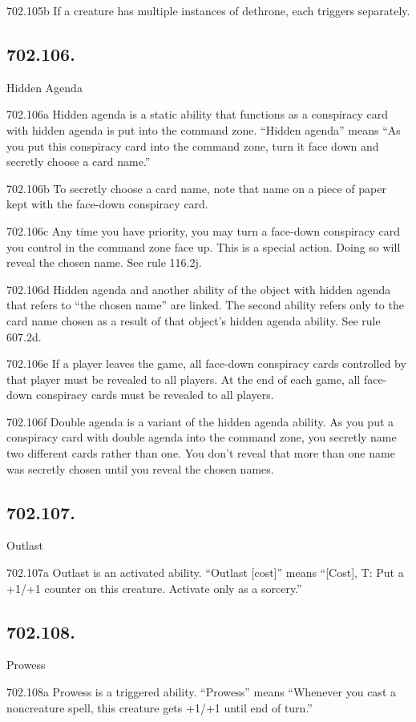 702.105b If a creature has multiple instances of dethrone, each triggers separately.

\subsection*{702.106.}
Hidden Agenda

702.106a Hidden agenda is a static ability that functions as a conspiracy card with hidden agenda is put into the command zone. “Hidden agenda” means “As you put this conspiracy card into the command zone, turn it face down and secretly choose a card name.”

702.106b To secretly choose a card name, note that name on a piece of paper kept with the face-down conspiracy card.

702.106c Any time you have priority, you may turn a face-down conspiracy card you control in the command zone face up. This is a special action. Doing so will reveal the chosen name. See rule 116.2j.

702.106d Hidden agenda and another ability of the object with hidden agenda that refers to “the chosen name” are linked. The second ability refers only to the card name chosen as a result of that object’s hidden agenda ability. See rule 607.2d.

702.106e If a player leaves the game, all face-down conspiracy cards controlled by that player must be revealed to all players. At the end of each game, all face-down conspiracy cards must be revealed to all players.

702.106f Double agenda is a variant of the hidden agenda ability. As you put a conspiracy card with double agenda into the command zone, you secretly name two different cards rather than one. You don’t reveal that more than one name was secretly chosen until you reveal the chosen names.

\subsection*{702.107.}
Outlast

702.107a Outlast is an activated ability. “Outlast [cost]” means “[Cost], {T}: Put a +1/+1 counter on this creature. Activate only as a sorcery.”

\subsection*{702.108.}
Prowess

702.108a Prowess is a triggered ability. “Prowess” means “Whenever you cast a noncreature spell, this creature gets +1/+1 until end of turn.”

